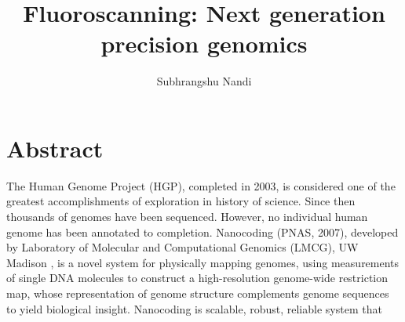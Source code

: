 \documentclass[11pt]{extarticle} %
\begin{document}

\title{Fluoroscanning: Next generation precision genomics}
\author{Subhrangshu Nandi \\
\date{}
}

\maketitle


\section*{Abstract}
The Human Genome Project (HGP), completed in 2003, is considered one of the greatest accomplishments of exploration in history of science. Since then thousands of genomes have been sequenced. However, no individual human genome has been annotated to completion. Nanocoding \cite{Jo_etal_2007_PNAS} (PNAS, 2007), developed by Laboratory of Molecular and Computational Genomics (LMCG), UW Madison , is a novel system for physically mapping genomes, using measurements of single DNA molecules to construct a high-resolution genome-wide restriction map, whose representation of genome structure complements genome sequences to yield biological insight. Nanocoding is scalable, robust, reliable system that

\newpage
\end{document}
